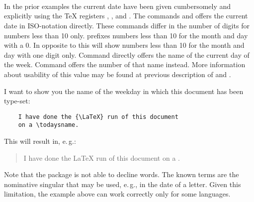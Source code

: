 \begin{Declaration}
  \\%
  \\
  \\%
\end{Declaration}%
%
%
%
%
In the prior examples the current date have been given cumbersomely and
explicitly using the \TeX{} registers ,
, and . The commands
 and 
offers the current date in ISO-notation directly. These commands differ in the
number of digits for numbers less than 10 only.  prefixes
numbers less than 10 for the month and day with a 0. In opposite to this
 will show numbers less than 10 for the month and day with one
digit only. Command  directly offers the name of the current
day of the week. Command  offers the number of that name
instead. More information about usability of this value may be found at
previous description of  and .

\begin{Example}
  I want to show you the name of the weekday in which this document has been
  type-set:
  \begin{lstlisting}
    I have done the {\LaTeX} run of this document 
    on a \todaysname.
  \end{lstlisting}
  This will result in, e.\,g.:
  \begin{quote}
    I have done the {\LaTeX} run of this document 
    on a \todaysname.
  \end{quote}
\end{Example}

Note that the package is not able to decline words. The known terms
are the nominative singular that may be used, e.\,g., in the date of a
letter. Given this limitation, the example above can work correctly
only for some languages.

